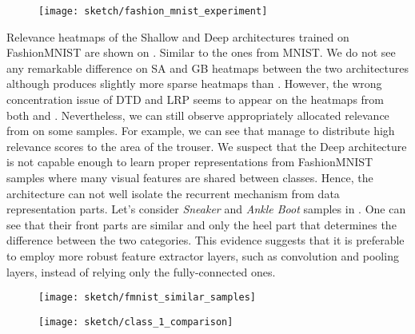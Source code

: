  \begin{figure}[!htb]
\centering
\texttt{[image: sketch/fashion\_mnist\_experiment]}
\label{fig:fashion_mnist_experiment}
\end{figure}

Relevance heatmaps of the Shallow and Deep architectures trained on  FashionMNIST  are shown on \addfigure{\ref{fig:fashion_mnist_experiment}}. Similar to the ones from MNIST. We do not see any remarkable difference on SA and GB heatmaps between the two architectures although  produces slightly more sparse heatmaps than . However, the wrong concentration issue of DTD and LRP seems to appear on the heatmaps from both  and . Nevertheless, we can still observe appropriately allocated relevance from  on some samples. For example, we can see  that  manage to distribute high relevance scores to the area of the trouser.  We suspect that the Deep architecture is not capable enough to learn proper representations from FashionMNIST samples where many visual features are shared between classes. Hence, the architecture can not well isolate the recurrent mechanism from data representation parts. Let's consider \textit{Sneaker} and \textit{Ankle Boot} samples in \addfigure{\ref{fig:fmnist_similar_samples}}. One can see that  their front parts are similar and only the heel part that determines the difference between the two categories. This evidence suggests that it is preferable to employ more robust feature extractor layers, such as convolution and pooling layers, instead of relying only the fully-connected ones.

 \begin{figure}[!htb]
\centering
\texttt{[image: sketch/fmnist\_similar\_samples]}
\label{fig:fmnist_similar_samples}
\end{figure}

 \begin{figure}[!htb]
\centering
\texttt{[image: sketch/class\_1\_comparison]}
\label{fig:class_1_comparison}
\end{figure}

